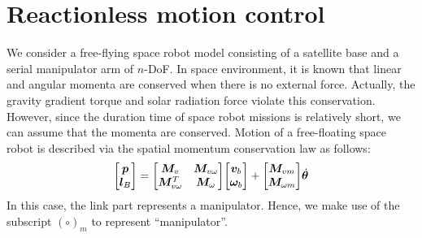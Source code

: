 %

\section{Reactionless motion control}
We consider a free-flying space robot model consisting of a satellite base and a serial manipulator arm
of $n$-DoF.
In space environment,
it is known that linear and angular momenta are conserved when there is no external force.
Actually,
the gravity gradient torque and solar radiation force violate this conservation.
However,
since the duration time of space robot missions is relatively short,
we can assume that the momenta are conserved.
Motion of a free-floating space robot is described via the spatial momentum conservation law as follows:
% 
\begin{align}
  {\begin{bmatrix} \bm{p} \\ \bm{l}_{B} \end{bmatrix}} = {\begin{bmatrix} \bm{M}_{v} & \bm{M}_{v\omega} \\ \bm{M}_{v \omega}^{T} & \bm{M}_{\omega} \end{bmatrix}}
  {\begin{bmatrix} \bm{v}_{b} \\ \bm{\omega}_{b} \end{bmatrix}} 
  +
  {\begin{bmatrix} \bm{M}_{vm} \\ \bm{M}_{\omega m} \end{bmatrix}}{\dot{\bm{\theta}}}\label{eq:SPA_MOM_SP}
\end{align} 
%
In this case, the link part represents a manipulator.
Hence, we make use of the subscript $(\circ)_{m}$ to represent ``manipulator''.

